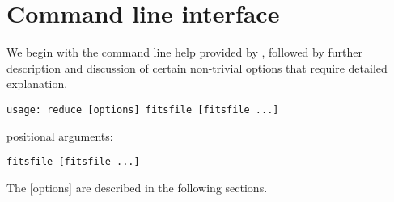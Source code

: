 \documentclass[letterpaper,10pt,english]{sphinxmanual}
\begin{document}
\section{Command line interface}
\label{interfaces:command-line-interface}
We begin with the command line help provided by , followed by
further description and discussion of certain non-trivial options that require
detailed explanation.

\begin{Verbatim}[commandchars=\\\{\}]
usage: reduce [options] fitsfile [fitsfile ...]
\end{Verbatim}

positional arguments:

\begin{Verbatim}[commandchars=\\\{\}]
fitsfile [fitsfile ...]
\end{Verbatim}

The {[}options{]} are described in the following sections.
\end{document}
